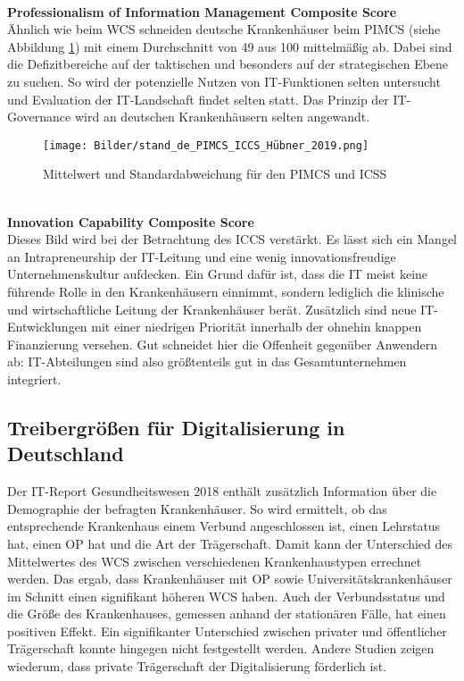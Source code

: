 \vspace{\parheadvspace}\\
\textbf{Professionalism of Information Management Composite Score}\\
Ähnlich wie beim WCS schneiden deutsche Krankenhäuser beim PIMCS (siehe Abbildung \ref{fig:stand_de_PIMCS_ICCS}) mit einem Durchschnitt von 49 aus 100 mittelmäßig ab. Dabei sind die Defizitbereiche auf der taktischen und besonders auf der strategischen Ebene zu suchen. So wird der potenzielle Nutzen von IT-Funktionen selten untersucht und Evaluation der IT-Landschaft findet selten statt. Das Prinzip der IT-Governance wird an deutschen Krankenhäusern selten angewandt.
\begin{figure}[ht]
	\centering
	\texttt{[image: Bilder/stand\_de\_PIMCS\_ICCS\_Hübner\_2019.png]}
	\caption{Mittelwert und Standardabweichung für den PIMCS und ICSS \parencite{huebner2019}}
	\label{fig:stand_de_PIMCS_ICCS}
\end{figure}
\vspace{\parheadvspace}\\
\textbf{Innovation Capability Composite Score}\\
Dieses Bild wird bei der Betrachtung des ICCS verstärkt. Es lässt sich ein Mangel an Intrapreneurship der IT-Leitung und eine wenig innovationsfreudige Unternehmenskultur aufdecken. Ein Grund dafür ist, dass die IT meist keine führende Rolle in den Krankenhäusern einnimmt, sondern lediglich die klinische und wirtschaftliche Leitung der Krankenhäuser berät. Zusätzlich sind neue IT-Entwicklungen mit einer niedrigen Priorität innerhalb der ohnehin knappen Finanzierung versehen. Gut schneidet hier die Offenheit gegenüber Anwendern ab: IT-Abteilungen sind also größtenteils gut in das Gesamtunternehmen integriert.

\subsection{Treibergrößen für Digitalisierung in Deutschland}
Der IT-Report Gesundheitswesen 2018 enthält zusätzlich Information über die Demographie der befragten Krankenhäuser. So wird ermittelt, ob das entsprechende Krankenhaus einem Verbund angeschlossen ist, einen Lehrstatus hat, einen OP hat und die Art der Trägerschaft. Damit kann der Unterschied des Mittelwertes des WCS zwischen verschiedenen Krankenhaustypen errechnet werden. Das ergab, dass Krankenhäuser mit OP sowie Universitätskrankenhäuser im Schnitt einen signifikant höheren WCS haben. Auch der Verbundsstatus und die Größe des Krankenhauses, gemessen anhand der stationären Fälle, hat einen positiven Effekt. \parencite{huebner2019}
Ein signifikanter Unterschied zwischen privater und öffentlicher Trägerschaft konnte hingegen nicht festgestellt werden. Andere Studien \parencite{cresswell2013} zeigen wiederum, dass private Trägerschaft der Digitalisierung förderlich ist.\\

